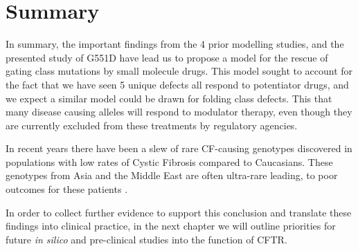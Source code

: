 \section{Summary}
In summary, the important findings from the 4 prior modelling studies, and the presented study of G551D have lead us to propose a model for the rescue of gating class mutations by small molecule drugs. This model sought to account for the fact that we have seen 5 unique defects all respond to potentiator drugs, and we expect a similar model could be drawn for folding class defects. This that many disease causing alleles will respond to modulator therapy, even though they are currently excluded from these treatments by regulatory agencies. 

In recent years there have been a slew of rare CF-causing genotypes discovered in populations with low rates of Cystic Fibrosis compared to Caucasians. These genotypes from Asia and the Middle East are often ultra-rare leading, to poor outcomes for these patients \cite{}. 

In order to collect further evidence to support this conclusion and translate these findings into clinical practice, in the next chapter we will outline priorities for future \textit{in silico} and pre-clinical studies into the function of CFTR.
